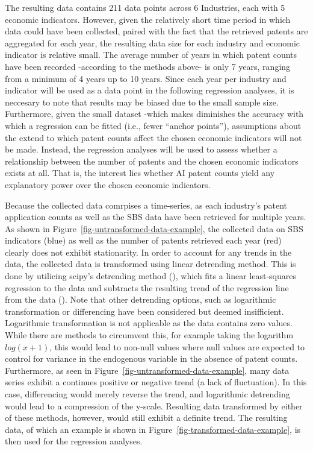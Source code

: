 \documentclass[
  11,
  a4paperpaper,
]{article}
\begin{document}
The resulting data contains 211 data points across 6 Industries, each
with 5 economic indicators. However, given the relatively short time
period in which data could have been collected, paired with the fact
that the retrieved patents are aggregated for each year, the resulting
data size for each industry and economic indicator is relative small.
The average number of years in which patent counts have been recorded
-according to the methods above- is only 7 years, ranging from a minimum
of 4 years up to 10 years. Since each year per industry and indicator
will be used as a data point in the following regression analyses, it is
neccesary to note that results may be biased due to the small sample
size. Furthermore, given the small dataset -which makes diminishes the
accuracy with which a regression can be fitted (i.e., fewer ``anchor
points''), assumptions about the extend to which patent counts affect
the chosen economic indicators will not be made. Instead, the regression
analyses will be used to assess whether a relationship between the
number of patents and the chosen economic indicators exists at all. That
is, the interest lies whether AI patent counts yield any explanatory
power over the chosen economic indicators.

Because the collected data comrpises a time-series, as each industry's
patent application counts as well as the SBS data have been retrieved
for multiple years. As shown in
Figure~\ref{fig-untransformed-data-example}, the collected data on SBS
indicators (blue) as well as the number of patents retrieved each year
(red) clearly does not exhibit stationarity. In order to account for any
trends in the data, the collected data is transformed using linear
detrending method. This is done by utilicing scipy's detrending method
(), which fits
a linear least-squares regression to the data and subtracts the
resulting trend of the regression line from the data
(). Note that other detrending options, such as
logarithmic transformation or differencing have been considered but
deemed insifficient. Logarithmic transformation is not applicable as the
data contains zero values. While there are methods to circumvent this,
for example taking the logarithm \(log(x+1)\), this would lead to
non-null values where null values are expected to control for variance
in the endogenous variable in the absence of patent counts. Furthermore,
as seen in Figure~\ref{fig-untransformed-data-example}, many data series
exhibit a continues positive or negative trend (a lack of fluctuation).
In this case, differencing would merely reverse the trend, and
logarithmic detrending would lead to a compression of the y-scale.
Resulting data transformed by either of these methods, however, would
still exhibit a definite trend. The resulting data, of which an example
is shown in Figure~\ref{fig-transformed-data-example}, is then used for
the regression analyses.
\end{document}
